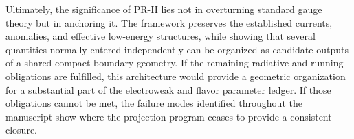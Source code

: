 \documentclass[11pt]{article}
\begin{document}
Ultimately, the significance of PR-II lies not in overturning standard gauge theory but in anchoring it. The framework preserves the established currents, anomalies, and effective low-energy structures, while showing that several quantities normally entered independently can be organized as candidate outputs of a shared compact-boundary geometry. If the remaining radiative and running obligations are fulfilled, this architecture would provide a geometric organization for a substantial part of the electroweak and flavor parameter ledger. If those obligations cannot be met, the failure modes identified throughout the manuscript show where the projection program ceases to provide a consistent closure.

\newpage
 
 
\end{document}
